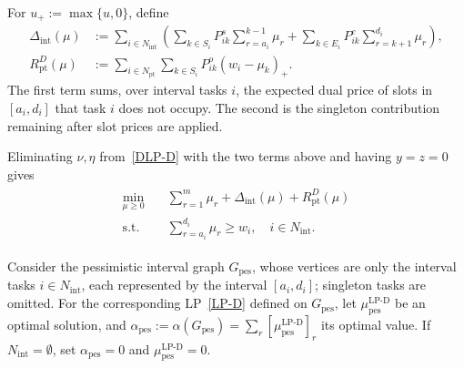 \documentclass{article}
\DeclareMathOperator{\pes}{pes}
\begin{document}
{For $u_+:=\max\{u,0\}$, define
\begin{align*}
\Delta_{\mathrm{int}}(\mu)
 &:={}\sum_{i\in N_{\mathrm{int}}}\left(\sum_{k\in S_i}P_{ik}^s\sum_{r=a_i}^{k-1}\mu_r
 +\sum_{k\in E_i}P_{ik}^e\sum_{r=k+1}^{d_i}\mu_r\right),\\
R_{\mathrm{pt}}^D(\mu)
 &:={}\sum_{i\in N_{\mathrm{pt}}}\sum_{k\in S_i}P_{ik}^o(w_i-\mu_k)_+.
\end{align*}
The first term sums, over interval tasks $i$, the expected dual price of slots in $[a_i,d_i]$ that task $i$ does not occupy. The second is the singleton contribution remaining after slot prices are applied.

Eliminating $\nu,\eta$ from~\eqref{DLP-D} with the two terms above and having $y=z=0$ gives
\begin{align}
\tag{LP-Dpes}\label{LP-Dpes}
\begin{split}
\min_{\mu\geq0}\quad &\sum_{r=1}^m\mu_r+\Delta_{\mathrm{int}}(\mu)+R_{\mathrm{pt}}^D(\mu)\\
\text{s.t.}\quad &\sum_{r=a_i}^{d_i}\mu_r\geq w_i,\quad i\in N_{\mathrm{int}}.
\end{split}
\end{align}}
Consider the pessimistic interval graph $G_{\pes}$, {whose vertices are only the interval tasks $i\in N_{\mathrm{int}}$, each represented by the interval $[a_i,d_i]$; singleton tasks are omitted.} %
{For the corresponding LP~\eqref{LP-D} defined on $G_{\pes}$,} let $\mu^{\operatorname{LP-D}}_{\pes}$ be an optimal solution, and $\alpha_{\pes}:=\alpha(G_{\pes})=\sum_r[\mu^{\operatorname{LP-D}}_{\pes}]_r$ its optimal value. {If $N_{\mathrm{int}}=\emptyset$, set $\alpha_{\pes}=0$ and $\mu^{\operatorname{LP-D}}_{\pes}=0$.}
\end{document}

